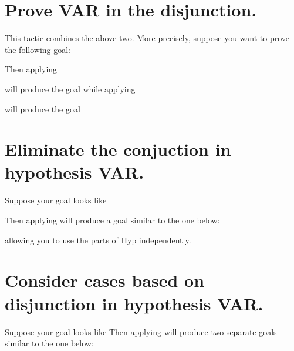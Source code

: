 


\section{Prove VAR in the disjunction.}
This tactic combines the above two. More precisely,
suppose you want to prove the following goal:

Then applying 

will produce the goal 
while applying

will produce the goal 

\section{Eliminate the conjuction in hypothesis VAR.}

Suppose your goal looks like

Then applying 
will produce a goal similar to the one below:

allowing you to use the parts of Hyp independently.


\section{Consider cases based on disjunction in hypothesis VAR.}
Suppose your goal looks like
Then applying 
will produce two separate goals similar to the one below:

